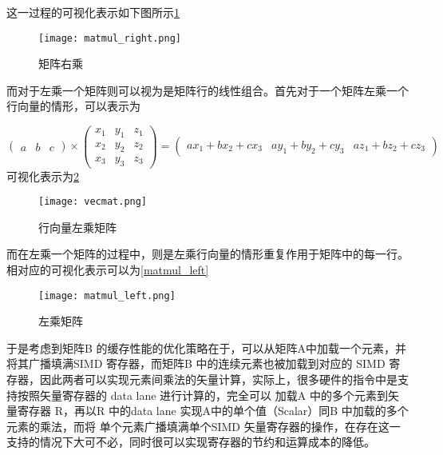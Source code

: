 这一过程的可视化表示如下图所示\ref{fig:matmul_right}

\begin{figure}
\centering
\texttt{[image: matmul\_right.png]}
\caption{矩阵右乘}
\label{fig:matmul_right}
\end{figure}

而对于左乘一个矩阵则可以视为是矩阵行的线性组合。首先对于一个矩阵左乘一个行向量的情形，可以表示为

\begin{equation}
  \begin{pmatrix}
    a & b & c
  \end{pmatrix}
  \times
  \begin{pmatrix}
    x_1 & y_1 & z_1 \\
    x_2 & y_2 & z_2 \\
    x_3 & y_3 & z_3 
  \end{pmatrix}
  = 
  \begin{pmatrix}
    ax_1 + bx_2 + cx_3 & ay_1 + by_2 + cy_3 & az_1 + bz_2 + cz_3
  \end{pmatrix}
\end{equation}
可视化表示为\ref{fig:vecmat}

\begin{figure}
\centering
\texttt{[image: vecmat.png]}
\caption{行向量左乘矩阵}
\label{fig:vecmat}
\end{figure}

而在左乘一个矩阵的过程中，则是左乘行向量的情形重复作用于矩阵中的每一行。相对应的可视化表示可以为\ref{matmul_left}

\begin{figure}
\centering
  \texttt{[image: matmul\_left.png]}
\caption{左乘矩阵}
\label{fig:matmul_left}
\end{figure}

于是考虑到矩阵B 的缓存性能的优化策略在于，可以从矩阵A中加载一个元素，并将其广播填满SIMD 寄存器，而矩阵B 中的连续元素也被加载到对应的
SIMD 寄存器，因此两者可以实现元素间乘法的矢量计算，实际上，很多硬件的指令中是支持按照矢量寄存器的 data lane 进行计算的，完全可以
加载A 中的多个元素到矢量寄存器 R，再以R 中的data lane 实现A中的单个值（Scalar）同B 中加载的多个元素的乘法，而将
单个元素广播填满单个SIMD 矢量寄存器的操作，在存在这一支持的情况下大可不必，同时很可以实现寄存器的节约和运算成本的降低。

